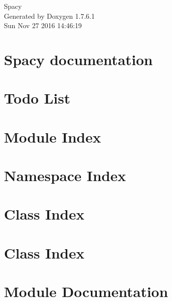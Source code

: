 \documentclass[a4paper]{book}
\begin{document}
\hypersetup{pageanchor=false,citecolor=blue}
\begin{titlepage}
\vspace*{7cm}
\begin{center}
{\Large \-Spacy }\\
\vspace*{1cm}
{\large \-Generated by Doxygen 1.7.6.1}\\
\vspace*{0.5cm}
{\small Sun Nov 27 2016 14:46:19}\\
\end{center}
\end{titlepage}
\clearemptydoublepage
{}
\tableofcontents
\clearemptydoublepage
{}
\hypersetup{pageanchor=true,citecolor=blue}
\chapter{\-Spacy documentation}
\label{index}\hypertarget{index}{}
\chapter{\-Todo \-List}
\label{todo}
\hypertarget{todo}{}

\chapter{\-Module \-Index}

\chapter{\-Namespace \-Index}

\chapter{\-Class \-Index}

\chapter{\-Class \-Index}

\chapter{\-Module \-Documentation}













\end{document}
